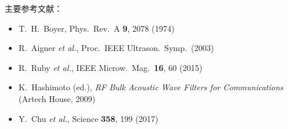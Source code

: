 \documentclass[11pt,a4paper]{article}
\begin{document}
\vspace{0.5em}
\noindent
主要参考文献：
\begin{itemize}
\item T.~H.~Boyer, Phys.\ Rev.\ A \textbf{9}, 2078 (1974)
\item R.~Aigner \textit{et al.}, Proc.\ IEEE Ultrason.\ Symp.\ (2003)
\item R.~Ruby \textit{et al.}, IEEE Microw.\ Mag.\ \textbf{16}, 60 (2015)
\item K.~Hashimoto (ed.), \textit{RF Bulk Acoustic Wave Filters for
Communications} (Artech House, 2009)
\item Y.~Chu \textit{et al.}, Science \textbf{358}, 199 (2017)
\end{itemize}
\end{document}
